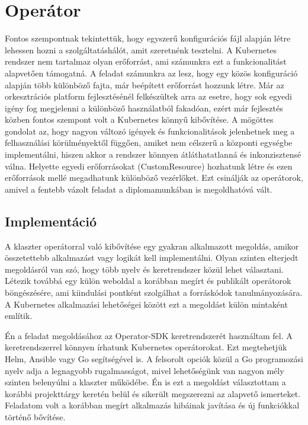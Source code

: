 \section{Operátor}
Fontos szempontnak tekintettük, hogy egyszerű konfigurációs fájl alapján létre lehessen hozni a szolgáltatáshálót, amit szeretnénk tesztelni.
A Kubernetes rendszer nem tartalmaz olyan erőforrást, ami számunkra ezt a funkcionalitást alapvetően támogatná.
A feladat számunkra az lesz, hogy egy közös konfiguráció alapján több különböző fajta, már beépített erőforrást hozzunk létre.
Már az orkesztrációs platform fejlesztésénél felkészültek arra az esetre, hogy sok egyedi igény fog megjelenni a különböző használatból fakadóan, ezért már fejlesztés közben fontos szempont volt a Kubernetes könnyű kibővítése.
A mögöttes gondolat az, hogy nagyon változó igények és funkcionalitások jelenhetnek meg a felhasználási körülményektől függően, amiket nem célszerű a központi egységbe implementálni, hiszen akkor a rendszer könnyen átláthatatlanná és inkonzisztensé válna.
Helyette egyedi erőforrásokat (CustomResource) hozhatunk létre és ezen erőforrások mellé megadhatunk különböző vezérlőket. Ezt csinálják az operátorok, amivel a fentebb vázolt feladat a diplomamunkában is megoldhatóvá vált.

\subsection{Implementáció}
A klaszter operátorral való kibővítése egy gyakran alkalmazott megoldás, amikor összetettebb alkalmazást vagy logikát kell implementálni.
Olyan szinten elterjedt megoldásról van szó, hogy több nyelv és keretrendszer közül lehet választani\citep{availableOperatorFrameworks}.
Létezik továbbá egy külön weboldal a korábban megírt és publikált operátorok böngészésére, ami kiindulási pontként szolgálhat a forráskódok tanulmányozására.\citep{operatorhub} 
A Kubernetes alkalmazási lehetőségei között ezt a megoldást külön mintaként említik.\citep{KubernetesPatterns} 

Én a feladat megoldásához az Operator-SDK\citep{operatorSDK} keretrendszerét használtam fel. 
A keretrendszerrel könnyen írhatunk Kubernetes operátorokat.
Ezt megtehetjük Helm, Ansible vagy Go segítségével is.
A felsorolt opciók közül a Go programozási nyelv adja a legnagyobb rugalmasságot, mivel lehetőségünk van nagyon mély szinten belenyúlni a klaszter működébe.
Én is ezt a megoldást választottam a korábbi projekttárgy keretén belül és sikerült megszerezni az alapvető ismerteket. 
Feladatom volt a korábban megírt alkalmazás hibáinak javítása és új funkciókkal történő bővítése.

